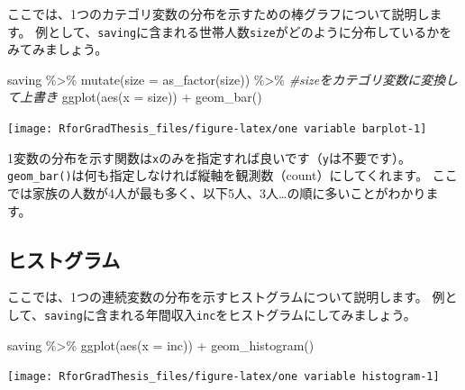 \documentclass[
]{book}
\newenvironment{Shaded}{\begin{snugshade}}{\end{snugshade}}
\newcommand{\AttributeTok}[1]{\textcolor[rgb]{0.77,0.63,0.00}{#1}}
\newcommand{\CommentTok}[1]{\textcolor[rgb]{0.56,0.35,0.01}{\textit{#1}}}
\newcommand{\FunctionTok}[1]{\textcolor[rgb]{0.00,0.00,0.00}{#1}}
\newcommand{\NormalTok}[1]{#1}
\newcommand{\SpecialCharTok}[1]{\textcolor[rgb]{0.00,0.00,0.00}{#1}}
\begin{document}
ここでは、1つのカテゴリ変数の分布を示すための棒グラフについて説明します。
例として、\texttt{saving}に含まれる世帯人数\texttt{size}がどのように分布しているかをみてみましょう。

\begin{Shaded}
\begin{Highlighting}[]
\NormalTok{saving }\SpecialCharTok{\%\textgreater{}\%}
  \FunctionTok{mutate}\NormalTok{(}\AttributeTok{size =} \FunctionTok{as\_factor}\NormalTok{(size)) }\SpecialCharTok{\%\textgreater{}\%} \CommentTok{\#sizeをカテゴリ変数に変換して上書き}
  \FunctionTok{ggplot}\NormalTok{(}\FunctionTok{aes}\NormalTok{(}\AttributeTok{x =}\NormalTok{ size)) }\SpecialCharTok{+}
  \FunctionTok{geom\_bar}\NormalTok{()}
\end{Highlighting}
\end{Shaded}

\begin{center}\texttt{[image: RforGradThesis\_files/figure-latex/one variable barplot-1]} \end{center}

1変数の分布を示す関数は\texttt{x}のみを指定すれば良いです（\texttt{y}は不要です）。
\texttt{geom\_bar()}は何も指定しなければ縦軸を観測数（count）にしてくれます。
ここでは家族の人数が4人が最も多く、以下5人、3人\ldots の順に多いことがわかります。

\hypertarget{ux30d2ux30b9ux30c8ux30b0ux30e9ux30e0}{%
\subsection{ヒストグラム}\label{ux30d2ux30b9ux30c8ux30b0ux30e9ux30e0}}

ここでは、1つの連続変数の分布を示すヒストグラムについて説明します。
例として、\texttt{saving}に含まれる年間収入\texttt{inc}をヒストグラムにしてみましょう。

\begin{Shaded}
\begin{Highlighting}[]
\NormalTok{saving }\SpecialCharTok{\%\textgreater{}\%}
  \FunctionTok{ggplot}\NormalTok{(}\FunctionTok{aes}\NormalTok{(}\AttributeTok{x =}\NormalTok{ inc)) }\SpecialCharTok{+}
  \FunctionTok{geom\_histogram}\NormalTok{()}
\end{Highlighting}
\end{Shaded}

\begin{center}\texttt{[image: RforGradThesis\_files/figure-latex/one variable histogram-1]} \end{center}
\end{document}
